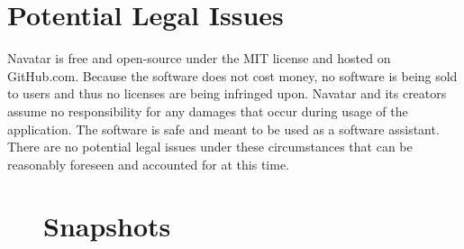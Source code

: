 \documentclass{scrreprt}
\begin{document}
\chapter{Potential Legal Issues}

Navatar is free and open-source under the MIT license and hosted on GitHub.com. Because the software does not cost money, no software is being sold to users and thus no licenses are being infringed upon. Navatar and its creators assume no responsibility for any damages that occur during usage of the application. The software is safe and meant to be used as a software assistant. There are no potential legal issues under these circumstances that can be reasonably foreseen and accounted for at this time.

\begin{figure}[ht!]
\chapter{Snapshots}

\end{figure}
\end{document}
